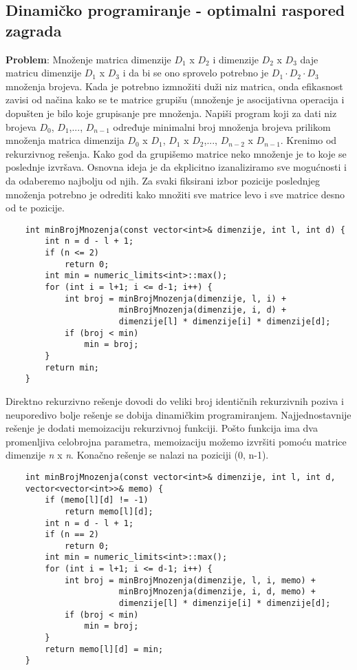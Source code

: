 \documentclass{article}
\begin{document}
\subsection{Dinamičko programiranje - optimalni raspored zagrada}
\textbf{Problem}: Množenje matrica dimenzije $D_1$ x $D_2$ i dimenzije $D_2$ x $D_3$ daje
matricu dimenzije $D_1$ x $D_3$ i da bi se ono sprovelo potrebno je
$D_1\cdot D_2\cdot D_3$
množenja brojeva. Kada je potrebno izmnožiti duži niz matrica, onda efikasnost
zavisi od načina kako se te matrice grupišu (množenje je asocijativna operacija i
dopušten je bilo koje grupisanje pre množenja. Napiši program koji za dati niz
brojeva $D_0$, $D_1$,..., $D_{n-1}$ određuje minimalni broj množenja brojeva prilikom
množenja matrica dimenzija $D_0$ x $D_1$, $D_1$ x $D_2$,..., 
$D_{n-2}$ x $D_{n-1}$.
\newline
Krenimo od rekurzivnog rešenja. Kako god da grupišemo matrice neko množenje
je to koje se poslednje izvršava. Osnovna
ideja je da ekplicitno izanaliziramo sve mogućnosti i da odaberemo najbolju od
njih. Za svaki fiksirani izbor pozicije poslednjeg množenja potrebno je odrediti
kako množiti sve matrice levo i sve matrice desno od te pozicije. 
\begin{lstlisting}
    int minBrojMnozenja(const vector<int>& dimenzije, int l, int d) {
        int n = d - l + 1;
        if (n <= 2)
            return 0;
        int min = numeric_limits<int>::max();
        for (int i = l+1; i <= d-1; i++) {
            int broj = minBrojMnozenja(dimenzije, l, i) +
                       minBrojMnozenja(dimenzije, i, d) +
                       dimenzije[l] * dimenzije[i] * dimenzije[d];
            if (broj < min)
                min = broj;
        }
        return min;
    }
\end{lstlisting}
Direktno rekurzivno rešenje dovodi do veliki broj identičnih rekurzivnih poziva
i neuporedivo bolje rešenje se dobija dinamičkim programiranjem. Najjednostavnije rešenje je dodati memoizaciju rekurzivnoj funkciji. Pošto funkcija ima
dva promenljiva celobrojna parametra, memoizaciju možemo izvršiti pomoću
matrice dimenzije \textit{n} x \textit{n}. Konačno rešenje se nalazi na poziciji (0, n-1).
\begin{lstlisting}
    int minBrojMnozenja(const vector<int>& dimenzije, int l, int d,
    vector<vector<int>>& memo) {
        if (memo[l][d] != -1)
            return memo[l][d];
        int n = d - l + 1;
        if (n == 2)
            return 0;
        int min = numeric_limits<int>::max();
        for (int i = l+1; i <= d-1; i++) {
            int broj = minBrojMnozenja(dimenzije, l, i, memo) +
                       minBrojMnozenja(dimenzije, i, d, memo) +
                       dimenzije[l] * dimenzije[i] * dimenzije[d];
            if (broj < min)
                min = broj;
        }
        return memo[l][d] = min;
    }
\end{lstlisting}
\end{document}
